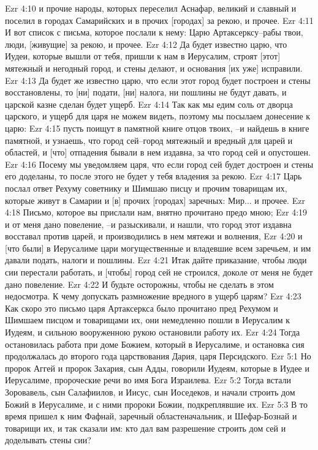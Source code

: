 Ezr 4:10  и прочие народы, которых переселил Аснафар, великий и славный и поселил в городах Самарийских и в прочих [городах] за рекою, и прочее.
Ezr 4:11  И вот список с письма, которое послали к нему: Царю Артаксерксу--рабы твои, люди, [живущие] за рекою, и прочее.
Ezr 4:12  Да будет известно царю, что Иудеи, которые вышли от тебя, пришли к нам в Иерусалим, строят [этот] мятежный и негодный город, и стены делают, и основания [их уже] исправили.
Ezr 4:13  Да будет же известно царю, что если этот город будет построен и стены восстановлены, то [ни] подати, [ни] налога, ни пошлины не будут давать, и царской казне сделан будет ущерб.
Ezr 4:14  Так как мы едим соль от дворца царского, и ущерб для царя не можем видеть, поэтому мы посылаем донесение к царю:
Ezr 4:15  пусть поищут в памятной книге отцов твоих, --и найдешь в книге памятной, и узнаешь, что город сей--город мятежный и вредный для царей и областей, и [что] отпадения бывали в нем издавна, за что город сей и опустошен.
Ezr 4:16  Посему мы уведомляем царя, что если город сей будет достроен и стены его доделаны, то после этого не будет у тебя владения за рекою.
Ezr 4:17  Царь послал ответ Рехуму советнику и Шимшаю писцу и прочим товарищам их, которые живут в Самарии и [в] прочих [городах] заречных: Мир... и прочее.
Ezr 4:18  Письмо, которое вы прислали нам, внятно прочитано предо мною;
Ezr 4:19  и от меня дано повеление, --и разыскивали, и нашли, что город этот издавна восставал против царей, и производились в нем мятежи и волнения,
Ezr 4:20  и [что были] в Иерусалиме цари могущественные и владевшие всем заречьем, и им давали подать, налоги и пошлины.
Ezr 4:21  Итак дайте приказание, чтобы люди сии перестали работать, и [чтобы] город сей не строился, доколе от меня не будет дано повеление.
Ezr 4:22  И будьте осторожны, чтобы не сделать в этом недосмотра. К чему допускать размножение вредного в ущерб царям?
Ezr 4:23  Как скоро это письмо царя Артаксеркса было прочитано пред Рехумом и Шимшаем писцом и товарищами их, они немедленно пошли в Иерусалим к Иудеям, и сильною вооруженною рукою остановили работу их.
Ezr 4:24  Тогда остановилась работа при доме Божием, который в Иерусалиме, и остановка сия продолжалась до второго года царствования Дария, царя Персидского.
Ezr 5:1  Но пророк Аггей и пророк Захария, сын Адды, говорили Иудеям, которые в Иудее и Иерусалиме, пророческие речи во имя Бога Израилева.
Ezr 5:2  Тогда встали Зоровавель, сын Салафиилов, и Иисус, сын Иоседеков, и начали строить дом Божий в Иерусалиме, и с ними пророки Божии, подкреплявшие их.
Ezr 5:3  В то время пришел к ним Фафнай, заречный областеначальник, и Шефар-Бознай и товарищи их, и так сказали им: кто дал вам разрешение строить дом сей и доделывать стены сии?
